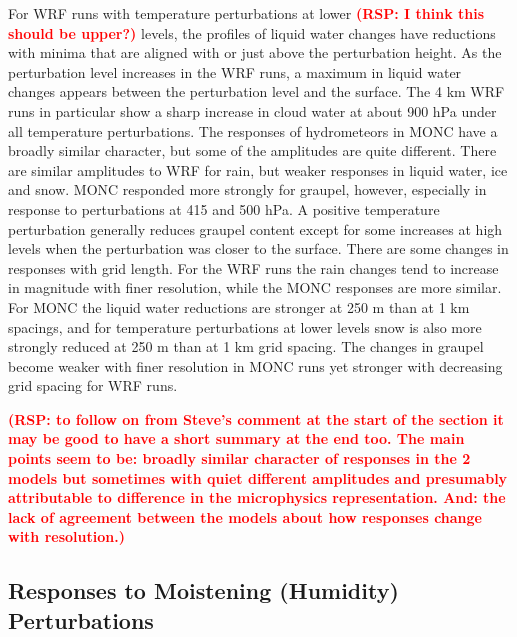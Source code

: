 \documentclass[draft]{agujournal2019}
\newcommand{\todo}[1]{\textcolor{red}{\textbf{(#1)}}}
\begin{document}
For WRF runs with temperature perturbations at lower \todo{RSP: I think this
should be upper?} levels, the profiles of liquid water changes have reductions
with minima that are aligned with or just above the perturbation height. As the
perturbation level increases in the WRF runs, a maximum in liquid water changes
appears between the perturbation level and the surface. The 4 km WRF runs in
particular show a sharp increase in cloud water at about 900 hPa under all
temperature perturbations. The responses of hydrometeors in MONC have a broadly
similar character, but some of the amplitudes are quite different. There are
similar amplitudes to WRF for rain, but weaker responses in liquid water, ice
and snow. MONC responded more strongly for graupel, however, especially in
response to perturbations at 415 and 500 hPa. A positive temperature
perturbation generally reduces graupel content except for some increases at high
levels when the perturbation was closer to the surface. There are some changes
in responses with grid length. For the WRF runs the rain changes tend to
increase in magnitude with finer resolution, while the MONC responses are more
similar. For MONC the liquid water reductions are stronger at 250 m than at 1 km
spacings, and for temperature perturbations at lower levels snow is also more
strongly reduced at 250 m than at 1 km grid spacing. The changes in graupel
become weaker with finer resolution in MONC runs yet stronger with decreasing
grid spacing for WRF runs. 

\todo{RSP: to follow on from Steve's comment at the
start of the section it may be good to have a short summary at the end too. The
main points seem to be: broadly similar character of responses in the 2 models
but sometimes with quiet different amplitudes and presumably attributable to
difference in the microphysics representation. And: the lack of agreement
between the models about how responses change with resolution.}

\subsection{Responses to Moistening (Humidity) Perturbations}
\end{document}
